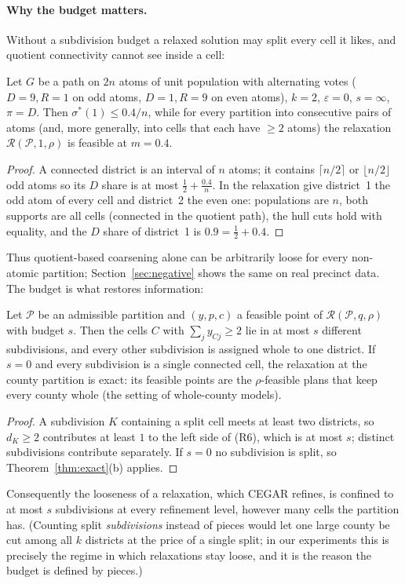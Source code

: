 \paragraph{Why the budget matters.}
Without a subdivision budget a relaxed solution may split every cell it likes, and quotient connectivity cannot see inside a cell:
\begin{proposition}\label{prop:blind}
Let $G$ be a path on $2n$ atoms of unit population with alternating votes ($D{=}9,R{=}1$ on odd atoms, $D{=}1,R{=}9$ on even atoms), $k=2$, $\varepsilon=0$, $s=\infty$, $\pi=D$. Then $\sigma^*(1)\le 0.4/n$, while for every partition into consecutive pairs of atoms (and, more generally, into cells that each have $\ge2$ atoms) the relaxation $\mathcal R(\mathcal P,1,\rho)$ is feasible at $m=0.4$.
\end{proposition}
\begin{proof}
A connected district is an interval of $n$ atoms; it contains $\lceil n/2\rceil$ or $\lfloor n/2\rfloor$ odd atoms so its $D$ share is at most $\tfrac12+\tfrac{0.4}{n}$. In the relaxation give district~1 the odd atom of every cell and district~2 the even one: populations are $n$, both supports are all cells (connected in the quotient path), the hull cuts hold with equality, and the $D$ share of district~1 is $0.9=\tfrac12+0.4$.
\end{proof}
Thus quotient-based coarsening alone can be arbitrarily loose for every non-atomic partition; Section~\ref{sec:negative} shows the same on real precinct data. The budget is what restores information:
\begin{proposition}\label{prop:confine}
Let $\mathcal P$ be an admissible partition and $(y,p,c)$ a feasible point of $\mathcal R(\mathcal P,q,\rho)$ with budget $s$. Then the cells $C$ with $\sum_jy_{Cj}\ge2$ lie in at most $s$ different subdivisions, and every other subdivision is assigned whole to one district. If $s=0$ and every subdivision is a single connected cell, the relaxation at the county partition is exact: its feasible points are the $\rho$-feasible plans that keep every county whole (the setting of whole-county models).
\end{proposition}
\begin{proof}
A subdivision $K$ containing a split cell meets at least two districts, so $d_K\ge2$ contributes at least $1$ to the left side of (R6), which is at most $s$; distinct subdivisions contribute separately. If $s=0$ no subdivision is split, so Theorem~\ref{thm:exact}(b) applies.
\end{proof}
Consequently the looseness of a relaxation, which CEGAR refines, is confined to at most $s$ subdivisions at every refinement level, however many cells the partition has. (Counting split \emph{subdivisions} instead of pieces would let one large county be cut among all $k$ districts at the price of a single split; in our experiments this is precisely the regime in which relaxations stay loose, and it is the reason the budget is defined by pieces.)
